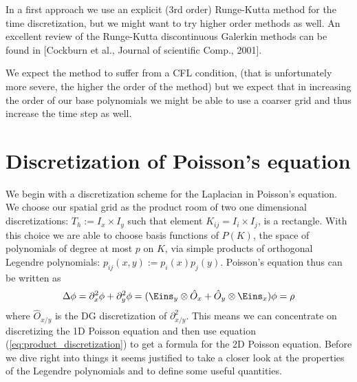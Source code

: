 \documentclass[a4paper,12pt]{scrartcl}
\begin{document}
In a first approach we use an explicit (3rd order) Runge-Kutta method for 
the time discretization, but we might want to try higher order methods as well.   
An excellent review of the Runge-Kutta discontinuous Galerkin methods can be found in [Cockburn et al., Journal of scientific Comp., 2001]. 

We expect the method to suffer from a CFL condition, (that is unfortunately more severe, the 
higher the order of the method) but we expect that in increasing the order of 
our base polynomials we might be able to use a coarser grid and thus increase the 
time step as well. 











\section{ Discretization of Poisson's equation}
We begin with a discretization scheme for the Laplacian in Poisson's equation.
We choose our spatial grid as the product room of two one dimensional
discretizations: $T_h := I_x \times I_y$ such that element $K_{ij} = I_i \times I_j$,
is a rectangle. With this choice we are able to choose basis functions 
of $P(K)$, the space of polynomials of degree at most $p$ on $K$, 
via simple products of orthogonal Legendre polynomials: 
$p_{ij}(x,y) := p_i(x) p_j(y)$. Poisson's equation thus can be written as
\begin{align}
    \Delta \phi = \partial_x^2 \phi + \partial_y^2 \phi = (\Eins_y \otimes \hat O_x + \hat O_y \otimes \Eins_x) \phi = \rho
    \label{eq:product_discretization}
\end{align}
where $\hat O_{x/y}$ is the DG discretization of $\partial_{x/y}^2$. This means we 
can concentrate on discretizing the 1D Poisson equation and then use
equation (\ref{eq:product_discretization}) to get a formula for the 2D Poisson 
equation.
Before we dive right into things it seems justified to take a closer look at the 
properties of the Legendre polynomials and to define some useful quantities.
\end{document}
